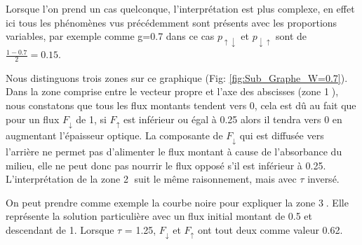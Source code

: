 \documentclass[12pt]{article}
\begin{document}
Lorsque l'on prend un cas quelconque, l'interprétation est plus complexe, en effet ici tous les phénomènes vus précédemment sont présents avec les proportions variables, par exemple comme g=0.7 dans ce cas $p_{{\uparrow}{\downarrow}}$ et $p_{{\downarrow}{\uparrow}}$ sont de $\frac{1-0.7}{2}=0.15$.\par
Nous distinguons trois zones sur ce graphique (Fig: \ref{fig:Sub_Graphe_W=0.7}). Dans la zone comprise entre le vecteur propre et l'axe des abscisses (zone \textcircled{\small1}), nous constatons que tous les flux montants tendent vers 0, cela est dû au fait que pour un flux $F_{\downarrow}$ de 1, si $F_{\uparrow}$ est inférieur ou égal à 0.25 alors il tendra vers 0 en augmentant l'épaisseur optique. La composante de  $F_{\downarrow}$ qui est diffusée vers l'arrière ne permet pas d'alimenter le flux montant à cause de l'absorbance du milieu, elle ne peut donc pas nourrir le flux opposé s'il est inférieur à 0.25.
L'interprétation de la zone \textcircled{\small2} suit le même raisonnement, mais avec $\tau$ inversé. 
\par
On peut prendre comme exemple la courbe noire pour expliquer la zone \textcircled{\small3}. Elle représente la solution particulière avec un flux initial montant de 0.5 et descendant de 1. Lorsque $\tau$ = 1.25, $F_{\downarrow}$ et  $F_{\uparrow}$ ont tout deux comme valeur 0.62. 
\end{document}
